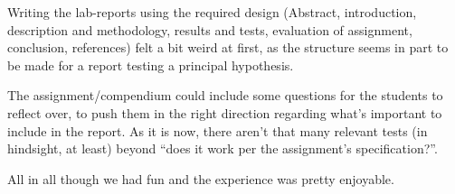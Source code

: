 Writing the lab-reports using the required design (Abstract, introduction, description and methodology, results and tests, evaluation of assignment, conclusion, references) felt a bit weird at first, as the structure seems in part to be made for a report testing a principal hypothesis.

The assignment/compendium could include some questions for the students to reflect over, to push them in the right direction regarding what's important to include in the report.
As it is now, there aren't that many relevant tests (in hindsight, at least) beyond ``does it work per the assignment's specification?''.

All in all though we had fun and the experience was pretty enjoyable.
